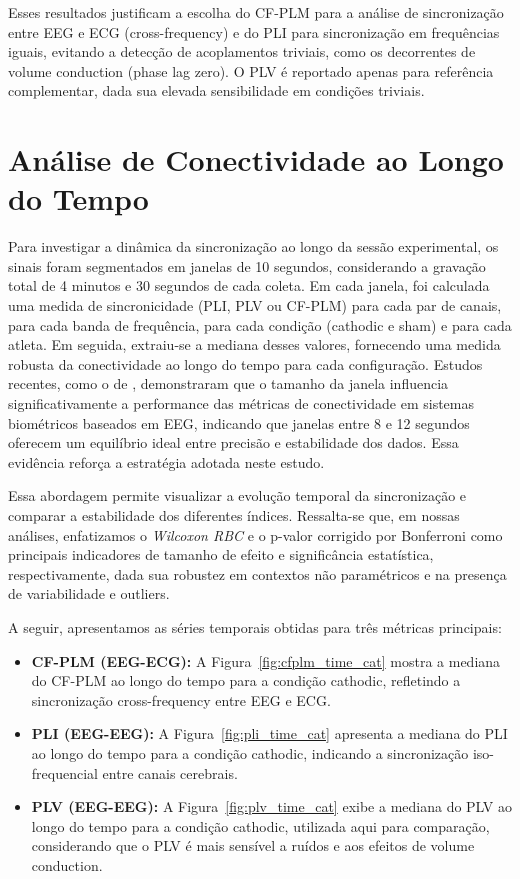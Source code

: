 Esses resultados justificam a escolha do CF-PLM para a análise de sincronização entre EEG e ECG (cross-frequency) e do PLI para sincronização em frequências iguais, evitando a detecção de acoplamentos triviais, como os decorrentes de volume conduction (phase lag zero). O PLV é reportado apenas para referência complementar, dada sua elevada sensibilidade em condições triviais.

\section{Análise de Conectividade ao Longo do Tempo}
\label{sec:connectivity_over_time}

Para investigar a dinâmica da sincronização ao longo da sessão experimental, os sinais foram segmentados em janelas de 10 segundos, considerando a gravação total de 4 minutos e 30 segundos de cada coleta. Em cada janela, foi calculada uma medida de sincronicidade (PLI, PLV ou CF-PLM) para cada par de canais, para cada banda de frequência, para cada condição (cathodic e sham) e para cada atleta. Em seguida, extraiu-se a mediana desses valores, fornecendo uma medida robusta da conectividade ao longo do tempo para cada configuração. Estudos recentes, como o de \citet{didaci2024how}, demonstraram que o tamanho da janela influencia significativamente a performance das métricas de conectividade em sistemas biométricos baseados em EEG, indicando que janelas entre 8 e 12 segundos oferecem um equilíbrio ideal entre precisão e estabilidade dos dados. Essa evidência reforça a estratégia adotada neste estudo.

Essa abordagem permite visualizar a evolução temporal da sincronização e comparar a estabilidade dos diferentes índices. Ressalta-se que, em nossas análises, enfatizamos o \emph{Wilcoxon RBC} e o p-valor corrigido por Bonferroni como principais indicadores de tamanho de efeito e significância estatística, respectivamente, dada sua robustez em contextos não paramétricos e na presença de variabilidade e outliers.

A seguir, apresentamos as séries temporais obtidas para três métricas principais:

\begin{itemize}
    \item \textbf{CF-PLM (EEG-ECG):} A Figura~\ref{fig:cfplm_time_cat} mostra a mediana do CF-PLM ao longo do tempo para a condição cathodic, refletindo a sincronização cross-frequency entre EEG e ECG.
    \item \textbf{PLI (EEG-EEG):} A Figura~\ref{fig:pli_time_cat} apresenta a mediana do PLI ao longo do tempo para a condição cathodic, indicando a sincronização iso-frequencial entre canais cerebrais.
    \item \textbf{PLV (EEG-EEG):} A Figura~\ref{fig:plv_time_cat} exibe a mediana do PLV ao longo do tempo para a condição cathodic, utilizada aqui para comparação, considerando que o PLV é mais sensível a ruídos e aos efeitos de volume conduction.
\end{itemize}

